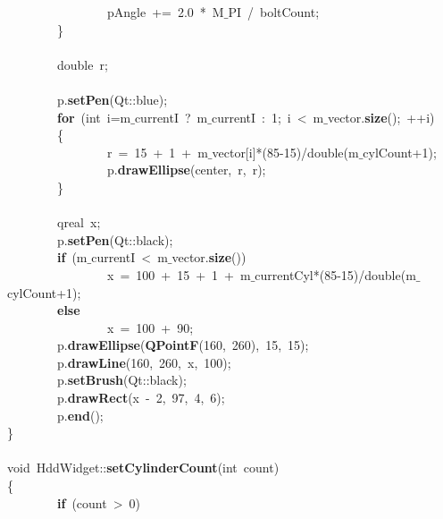 \mbox{}\ \ \ \ \ \ \ \ \ \ \ \ \ \ \ \ pAngle\ +=\ 2.0\ *\ M$\_$PI\ /\ boltCount; \\
\mbox{}\ \ \ \ \ \ \ \ \} \\
\mbox{} \\
\mbox{}\ \ \ \ \ \ \ \ double\ r; \\
\mbox{} \\
\mbox{}\ \ \ \ \ \ \ \ p.\textbf{setPen}(Qt::blue); \\
\mbox{}\ \ \ \ \ \ \ \ \textbf{for}\ (int\ i=m$\_$currentI\ ?\ m$\_$currentI\ :\ 1;\ i\ \textless{}\ m$\_$vector.\textbf{size}();\ ++i) \\
\mbox{}\ \ \ \ \ \ \ \ \{ \\
\mbox{}\ \ \ \ \ \ \ \ \ \ \ \ \ \ \ \ r\ =\ 15\ +\ 1\ +\ m$\_$vector[i]*(85-15)/double(m$\_$cylCount+1); \\
\mbox{}\ \ \ \ \ \ \ \ \ \ \ \ \ \ \ \ p.\textbf{drawEllipse}(center,\ r,\ r); \\
\mbox{}\ \ \ \ \ \ \ \ \} \\
\mbox{} \\
\mbox{}\ \ \ \ \ \ \ \ qreal\ x; \\
\mbox{}\ \ \ \ \ \ \ \ p.\textbf{setPen}(Qt::black); \\
\mbox{}\ \ \ \ \ \ \ \ \textbf{if}\ (m$\_$currentI\ \textless{}\ m$\_$vector.\textbf{size}()) \\
\mbox{}\ \ \ \ \ \ \ \ \ \ \ \ \ \ \ \ x\ =\ 100\ +\ 15\ +\ 1\ +\ m$\_$currentCyl*(85-15)/double(m$\_$cylCount+1); \\
\mbox{}\ \ \ \ \ \ \ \ \textbf{else} \\
\mbox{}\ \ \ \ \ \ \ \ \ \ \ \ \ \ \ \ x\ =\ 100\ +\ 90; \\
\mbox{}\ \ \ \ \ \ \ \ p.\textbf{drawEllipse}(\textbf{QPointF}(160,\ 260),\ 15,\ 15); \\
\mbox{}\ \ \ \ \ \ \ \ p.\textbf{drawLine}(160,\ 260,\ x,\ 100); \\
\mbox{}\ \ \ \ \ \ \ \ p.\textbf{setBrush}(Qt::black); \\
\mbox{}\ \ \ \ \ \ \ \ p.\textbf{drawRect}(x\ -\ 2,\ 97,\ 4,\ 6); \\
\mbox{}\ \ \ \ \ \ \ \ p.\textbf{end}(); \\
\mbox{}\} \\
\mbox{} \\
\mbox{}void\ HddWidget::\textbf{setCylinderCount}(int\ count) \\
\mbox{}\{ \\
\mbox{}\ \ \ \ \ \ \ \ \textbf{if}\ (count\ \textgreater{}\ 0) \\
